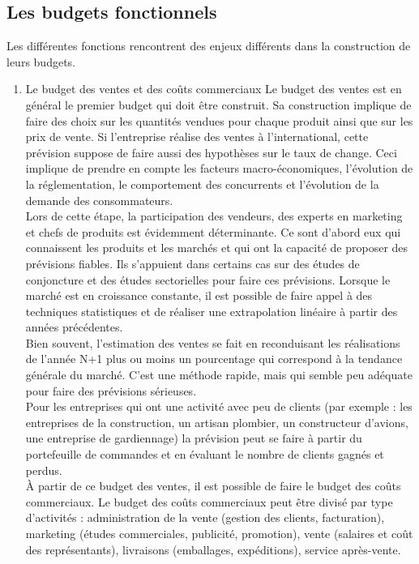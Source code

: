 \documentclass{tufte-handout}
\begin{document}
\subsection{Les budgets fonctionnels}
\label{sec:orgdd1b344}
Les différentes fonctions rencontrent des enjeux différents dans la construction de leurs budgets.\\
\begin{enumerate}
\item Le budget des ventes et des coûts commerciaux
\label{sec:org9352980}
Le budget des ventes est en général le premier budget qui doit être construit. Sa construction implique de faire des choix sur les quantités vendues pour chaque produit ainsi que sur les prix de vente. Si l'entreprise réalise des ventes à l'international, cette prévision suppose de faire aussi des hypothèses sur le taux de change. Ceci implique de prendre en compte les facteurs macro-économiques, l'évolution de la réglementation, le comportement des concurrents et l'évolution de la demande des consommateurs.\\
Lors de cette étape, la participation des vendeurs, des experts en marketing et chefs de produits est évidemment déterminante. Ce sont d'abord eux qui connaissent les produits et les marchés et qui ont la capacité de proposer des prévisions fiables. Ils s'appuient dans certains cas sur des études de conjoncture et des études sectorielles pour faire ces prévisions. Lorsque le marché est en croissance constante, il est possible de faire appel à des techniques statistiques et de réaliser une extrapolation linéaire à partir des années précédentes.\\
Bien souvent, l'estimation des ventes se fait en reconduisant les réalisations de l'année N+1 plus ou moins un pourcentage qui correspond à la tendance générale du marché. C'est une méthode rapide, mais qui semble peu adéquate pour faire des prévisions sérieuses.\\
Pour les entreprises qui ont une activité avec peu de clients (par exemple : les entreprises de la construction, un artisan plombier, un constructeur d'avions, une entreprise de gardiennage) la prévision peut se faire à partir du portefeuille de commandes et en évaluant le nombre de clients gagnés et perdus.\\
À partir de ce budget des ventes, il est possible de faire le budget des coûts commerciaux. Le budget des coûts commerciaux peut être divisé par type d'activités : administration de la vente (gestion des clients, facturation), marketing (études commerciales, publicité, promotion), vente (salaires et coût des représentants), livraisons (emballages, expéditions), service après-vente.\\

\end{enumerate}
\end{document}
